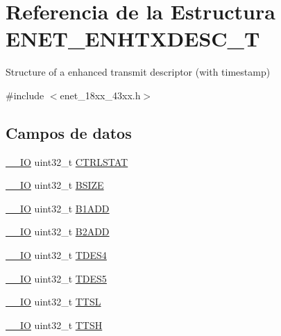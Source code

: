 \hypertarget{struct_e_n_e_t___e_n_h_t_x_d_e_s_c___t}{}\section{Referencia de la Estructura E\+N\+E\+T\+\_\+\+E\+N\+H\+T\+X\+D\+E\+S\+C\+\_\+T}
\label{struct_e_n_e_t___e_n_h_t_x_d_e_s_c___t}


Structure of a enhanced transmit descriptor (with timestamp)  




{\ttfamily \#include $<$enet\+\_\+18xx\+\_\+43xx.\+h$>$}

\subsection*{Campos de datos}
\begin{DoxyCompactItemize}
\item 
\hyperlink{core__sc300_8h_aec43007d9998a0a0e01faede4133d6be}{\+\_\+\+\_\+\+IO} uint32\+\_\+t \hyperlink{struct_e_n_e_t___e_n_h_t_x_d_e_s_c___t_a57ef6fedebbfbb6aa9f765be71c15dbb}{C\+T\+R\+L\+S\+T\+AT}
\item 
\hyperlink{core__sc300_8h_aec43007d9998a0a0e01faede4133d6be}{\+\_\+\+\_\+\+IO} uint32\+\_\+t \hyperlink{struct_e_n_e_t___e_n_h_t_x_d_e_s_c___t_af2098998d1719cc4a2e9ba78fb835a90}{B\+S\+I\+ZE}
\item 
\hyperlink{core__sc300_8h_aec43007d9998a0a0e01faede4133d6be}{\+\_\+\+\_\+\+IO} uint32\+\_\+t \hyperlink{struct_e_n_e_t___e_n_h_t_x_d_e_s_c___t_a9b99a80d13d854bce5c3f9646964c34e}{B1\+A\+DD}
\item 
\hyperlink{core__sc300_8h_aec43007d9998a0a0e01faede4133d6be}{\+\_\+\+\_\+\+IO} uint32\+\_\+t \hyperlink{struct_e_n_e_t___e_n_h_t_x_d_e_s_c___t_a3cf5d995cea5c3b42b9224871c5b18a1}{B2\+A\+DD}
\item 
\hyperlink{core__sc300_8h_aec43007d9998a0a0e01faede4133d6be}{\+\_\+\+\_\+\+IO} uint32\+\_\+t \hyperlink{struct_e_n_e_t___e_n_h_t_x_d_e_s_c___t_ab915578dc498ac976b70b4f2f78e6e98}{T\+D\+E\+S4}
\item 
\hyperlink{core__sc300_8h_aec43007d9998a0a0e01faede4133d6be}{\+\_\+\+\_\+\+IO} uint32\+\_\+t \hyperlink{struct_e_n_e_t___e_n_h_t_x_d_e_s_c___t_aaf71d062f1683e5d39a45ef7f2c6426a}{T\+D\+E\+S5}
\item 
\hyperlink{core__sc300_8h_aec43007d9998a0a0e01faede4133d6be}{\+\_\+\+\_\+\+IO} uint32\+\_\+t \hyperlink{struct_e_n_e_t___e_n_h_t_x_d_e_s_c___t_a4d320aa0e2dab7d9726c99a2c96a0cd5}{T\+T\+SL}
\item 
\hyperlink{core__sc300_8h_aec43007d9998a0a0e01faede4133d6be}{\+\_\+\+\_\+\+IO} uint32\+\_\+t \hyperlink{struct_e_n_e_t___e_n_h_t_x_d_e_s_c___t_aaedbaa65bc9e7793f623a0c51579caef}{T\+T\+SH}
\end{DoxyCompactItemize}


